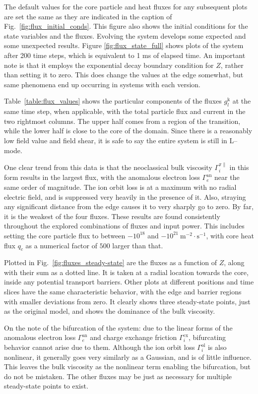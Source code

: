 The default values for the core particle and heat fluxes for any subsequent plots are set the same as they are indicated in the caption of Fig.~\ref{fig:flux_initial_conds}.
This figure also shows the initial conditions for the state variables and the fluxes.
Evolving the system develops some expected and some unexpected results.
Figure \ref{fig:flux_state_full} shows plots of the system after 200 time steps, which is equivalent to 1 ms of elapsed time.
An important note is that it employs the exponential decay boundary condition for $Z$, rather than setting it to zero.
This does change the values at the edge somewhat, but same phenomena end up occurring in systems with each version.

Table~\ref{table:flux_values} shows the particular components of the fluxes $g_l^\text{k}$ at the same time step, when applicable, with the total particle flux and current in the two rightmost columns.
The upper half comes from a region of the transition, while the lower half is close to the core of the domain.
Since there is a reasonably low field value and field shear, it is safe to say the entire system is still in L--mode.

One clear trend from this data is that the neoclassical bulk viscosity $\Gamma_i^{\pi\parallel}$ in this form results in the largest flux, with the anomalous electron loss $\Gamma_e^\text{an}$ near the same order of magnitude.
The ion orbit loss is at a maximum with no radial electric field, and is suppressed very heavily in the presence of it.
Also, straying any significant distance from the edge causes it to very sharply go to zero.
By far, it is the weakest of the four fluxes.
These results are found consistently throughout the explored combinations of fluxes and input power.
This includes setting the core particle flux to between $-10^{18}$ and $-10^{21}~\text{m}^{-2}\cdot\text{s}^{-1}$, with core heat flux $q_c$ as a numerical factor of $500$ larger than that.

Plotted in Fig.~\ref{fig:fluxes_steady-state} are the fluxes as a function of $Z$, along with their sum as a dotted line.
It is taken at a radial location towards the core, inside any potential transport barriers.
Other plots at different positions and time slices have the same characteristic behavior, with the edge and barrier regions with smaller deviations from zero.
It clearly shows three steady-state points, just as the original model, and shows the dominance of the bulk viscosity.

On the note of the bifurcation of the system: due to the linear forms of the anomalous electron loss $\Gamma_e^\text{an}$ and charge exchange friction $\Gamma_i^\text{cx}$, bifurcating behavior cannot arise due to them.
Although the ion orbit loss $\Gamma_i^\text{ol}$ is also nonlinear, it generally goes very similarly as a Gaussian, and is of little influence.
This leaves the bulk viscosity as the nonlinear term enabling the bifurcation, but do not be mistaken.
The other fluxes may be just as necessary for multiple steady-state points to exist.

